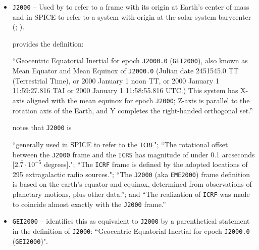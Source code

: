 \documentclass[draft]{agujournal2019}
\begin{document}

\begin{itemize}
    \parskip 0.1in 

    \item \texttt{J2000} -- Used by  to refer to a frame with its origin at Earth's center of mass and in SPICE to refer to a system with origin at the solar system barycenter (; ).
    
      provides the definition:
     
     ``Geocentric Equatorial Inertial for epoch \texttt{J2000.0} (\texttt{GEI2000}), also known as Mean Equator and Mean Equinox of \texttt{J2000.0} (Julian date 2451545.0 TT (Terrestrial Time), or 2000 January 1 noon TT, or 2000 January 1 11:59:27.816 TAI or 2000 January 1 11:58:55.816 UTC.) This system has X-axis aligned with the mean equinox for epoch \texttt{J2000}; Z-axis is parallel to the rotation axis of the Earth, and Y completes the right-handed orthogonal set.''


     notes that \texttt{J2000} is
    
    ``generally used in SPICE to refer to the \texttt{ICRF}"; ``The rotational offset between the \texttt{J2000} frame and the \texttt{ICRS} has magnitude of under 0.1 arcseconds [$2.\overline{7}\cdot 10^{-5}$ degrees]."; ``The \texttt{ICRF} frame is defined by the adopted locations of 295 extragalactic radio sources."; ``The \texttt{J2000} (aka \texttt{EME2000}) frame definition is based on the earth’s equator and equinox, determined from observations of planetary motions, plus other data.''; and ``The realization of \texttt{ICRF} was made to coincide almost exactly with the \texttt{J2000} frame.'' 



    \item \texttt{GEI2000} --  identifies this as equivalent to \texttt{J2000} by a parenthetical statement in the definition of \texttt{J2000}: ``Geocentric Equatorial Inertial for epoch \texttt{J2000.0} (\texttt{GEI2000})".


\end{itemize}
\end{document}
